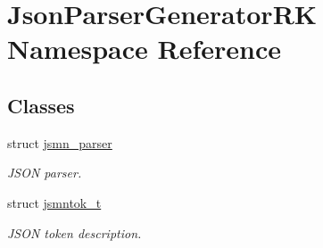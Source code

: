 \hypertarget{namespace_json_parser_generator_r_k}{}\section{Json\+Parser\+Generator\+RK Namespace Reference}
\label{namespace_json_parser_generator_r_k}
\subsection*{Classes}
\begin{DoxyCompactItemize}
\item 
struct \hyperlink{struct_json_parser_generator_r_k_1_1jsmn__parser}{jsmn\+\_\+parser}
\begin{DoxyCompactList}\small\item\em J\+S\+ON parser. \end{DoxyCompactList}\item 
struct \hyperlink{struct_json_parser_generator_r_k_1_1jsmntok__t}{jsmntok\+\_\+t}
\begin{DoxyCompactList}\small\item\em J\+S\+ON token description. \end{DoxyCompactList}\end{DoxyCompactItemize}
